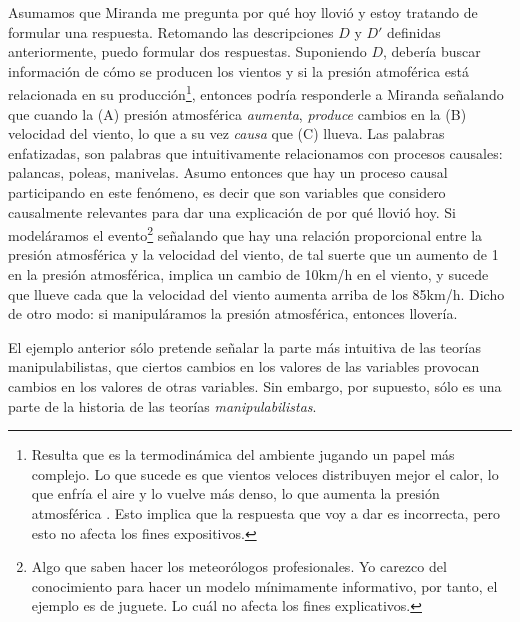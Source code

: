 Asumamos que Miranda me pregunta por qué hoy llovió y estoy tratando
de formular una respuesta. Retomando las descripciones $D$ y $D'$
definidas anteriormente, puedo formular dos respuestas. Suponiendo
$D$, debería buscar información de cómo se producen los vientos y si
la presión atmoférica está relacionada en su producción\footnote{
 Resulta que es la termodinámica del ambiente jugando un papel más
 complejo. Lo que sucede es que vientos veloces distribuyen mejor el
 calor, lo que enfría el aire y lo vuelve más denso, lo que aumenta la
 presión atmosférica \parencite{Spiridonov2021}. Esto implica que la
 respuesta que voy a dar es incorrecta, pero esto no afecta los fines
 expositivos. }, entonces podría responderle a Miranda señalando que
cuando la (A) presión atmosférica \emph{aumenta}, \emph{produce}
cambios en la (B) velocidad del viento, lo que a su vez \emph{causa}
que (C) llueva. Las palabras enfatizadas, son palabras que
intuitivamente relacionamos con procesos causales: palancas, poleas,
manivelas. Asumo entonces que hay un proceso causal participando en
este fenómeno, es decir que son variables que considero causalmente
relevantes para dar una explicación de por qué llovió hoy. Si
modeláramos el evento\footnote{ Algo que saben hacer los meteorólogos
 profesionales. Yo carezco del conocimiento para hacer un modelo
 mínimamente informativo, por tanto, el ejemplo es de juguete. Lo cuál
 no afecta los fines explicativos. } señalando que hay una relación
proporcional entre la presión atmosférica y la velocidad del viento,
de tal suerte que un aumento de 1 en la presión atmosférica, implica
un cambio de 10km/h en el viento, y sucede que llueve cada que la
velocidad del viento aumenta arriba de los 85km/h. Dicho de otro
modo: si manipuláramos la presión atmosférica, entonces llovería.

El ejemplo anterior sólo pretende señalar la parte más intuitiva de
las teorías manipulabilistas, que ciertos cambios en los valores de
las variables provocan cambios en los valores de otras variables. Sin
embargo, por supuesto, sólo es una parte de la historia de las
teorías \emph{manipulabilistas}.

